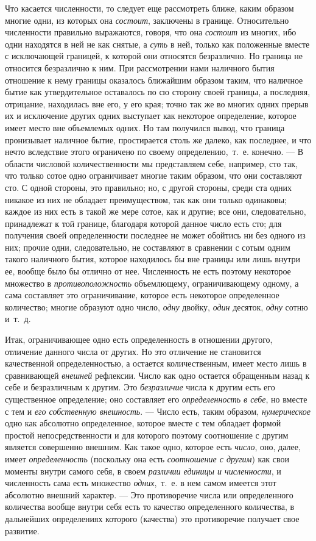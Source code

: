 {Что касается численности, то следует еще рассмотреть ближе, каким образом
многие одни, из которых она {\em состоит}, заключены в
границе. Относительно численности правильно выражаются, говоря, что она
{\em состоит} из многих, ибо одни находятся в ней не
как снятые, а {\em суть} в ней, только как положенные
вместе с исключающей границей, к которой они относятся безразлично. Но
граница не относится безразлично к ним. При рассмотрении нами наличного
бытия отношение к нему границы оказалось ближайшим образом таким, что
наличное бытие как утвердительное оставалось по сю сторону своей границы, а
последняя, отрицание, находилась вне его, у его края; точно так же во
многих одних прерыв их и исключение других одних выступает как некоторое
определение, которое имеет место вне объемлемых одних. Но там получился
вывод, что граница пронизывает наличное бытие, простирается столь же
далеко, как последнее, и что нечто вследствие этого ограничено по своему
определению,~т.~е. конечно. — В области числовой количественности мы
представляем себе, например, сто так, что только сотое одно ограничивает
многие таким образом, что они составляют сто. С одной стороны, это
правильно; но, с другой стороны, среди ста одних никакое из них не обладает
преимуществом, так как они только одинаковы; каждое из них есть в такой же
мере сотое, как и другие; все они, следовательно, принадлежат к той
границе, благодаря которой данное число есть сто; для получения своей
определенности последнее не может обойтись ни без одного из них; прочие
одни, следовательно, не составляют в сравнении с сотым одним такого
наличного бытия, которое находилось бы вне границы или лишь внутри ее,
вообще было бы отлично от нее. Численность не есть поэтому некоторое
множество в {\em противоположность} объемлющему,
ограничивающему одному, а сама составляет это ограничивание, которое есть
некоторое определенное количество; многие образуют одно число,
{\em одну} двойку, {\em один}
десяток, {\em одну} сотню и~т.~д.

Итак, ограничивающее одно есть определенность в отношении другого, отличение
данного числа от других. Но это отличение не становится качественной
определенностью, а остается количественным, имеет место лишь в сравнивающей
{\em внешней} рефлексии. Число как одно остается
обращенным назад к себе и безразличным к другим. Это
{\em безразличие} числа к другим есть его существенное
определение; оно составляет его {\em определенность в
себе}, но вместе с тем и {\em его собственную
внешность}. — Число есть, таким образом,
{\em нумерическое} одно как абсолютно определенное,
которое вместе с тем обладает формой простой непосредственности и для
которого поэтому соотношение с другим является совершенно внешним. Как
такое одно, которое есть {\em число}, оно, далее, имеет
{\em определенность} (поскольку она есть
{\em соотношение с другим}) как свои моменты внутри
самого себя, в своем {\em различии единицы и
численности}, и численность сама есть множество
{\em одних},~т.~е. в нем самом имеется этот абсолютно
внешний характер. — Это противоречие числа или определенного количества
вообще внутри себя есть то качество определенного количества, в дальнейших
определениях которого (качества) это противоречие получает свое развитие.

}
